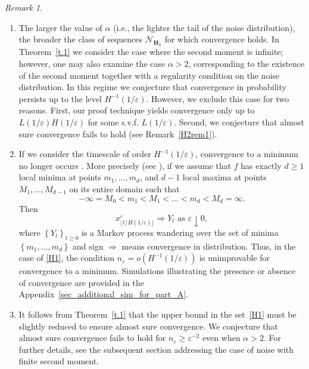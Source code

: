 \documentclass{article}
\theoremstyle{plain}
\theoremstyle{definition}
\theoremstyle{remark}
\newtheorem{remark}[theorem]{Remark}
\newcommand{\wra}{ \Rightarrow} %
\newcommand{\skk}[1]{\left\{ #1 \right\}} %
\begin{document}
\begin{remark}\label{H1rem1}
\begin{enumerate}
    \item The larger the value of $\alpha$ (i.e., the lighter the tail of the noise distribution), the broader the class of sequences $\mathcal{N}_{\mathbf{H_1}}$ for which  convergence holds. In Theorem~\ref{t.1} we consider the case where the second moment is infinite; however, one may also examine the case $\alpha > 2$, corresponding to the existence of the second moment together with a regularity condition on the noise distribution. In this regime we conjecture that convergence in probability persists up to the level $H^{-1}(1/\varepsilon)$. However, we exclude this case for two reasons. First, our proof technique yields convergence only up to $L(1/\varepsilon) H(1/\varepsilon)$ for some s.v.f. $L(1/\varepsilon)$. Second, we conjecture that almost sure convergence fails to hold (see Remark~\ref{H2rem1}).
       \item  If we consider the timescale of order $H^{-1}\left( 1/\varepsilon \right)$, convergence to a minimum no longer occurs \cite{wang2021eliminating}. More precisely (see \citet[Corollary B.1.]{wang2021eliminating}), if we assume that $f$ has exactly $d\geqslant 1$ local minima at points $m_1,\dots,m_d$, and $d-1$ local maxima at points $M_1,\dots,M_{d-1}$ on its entire domain such that
$$
-\infty = M_0<m_1<M_1<\dots<m_d<M_d = \infty. $$
Then
$$
    x_{\lfloor t/H\left( 1/\varepsilon \right)\rfloor}^{\varepsilon} \wra Y_{t} \text{ as } \varepsilon \downarrow 0,
$$
where $\skk{Y_{t}}_{t \geqslant 0}$ is a Markov process wandering over the set of minima $\skk{m_1, \ldots, m_d}$ and sign $\wra$ means convergence in distribution. Thus, in the case of \ref{H1}, the condition $n_{\varepsilon} = o\left(H^{-1}\left( 1/\varepsilon \right)\right)$ is unimprovable for convergence to a minimum. Simulations illustrating the presence or absence of convergence are provided in the Appendix~\ref{sec_additional_sim_for_part_A}.

\item It follows from Theorem~\ref{t.1} that the upper bound in the set~\ref{H1} must be slightly reduced to ensure almost sure convergence. We conjecture that almost sure convergence fails to hold for $n_{\varepsilon} \geq \varepsilon^{-2}$ even when $\alpha > 2$. For further details, see the subsequent section addressing the case of noise with finite second moment.
\end{enumerate}
\end{remark}
\end{document}
